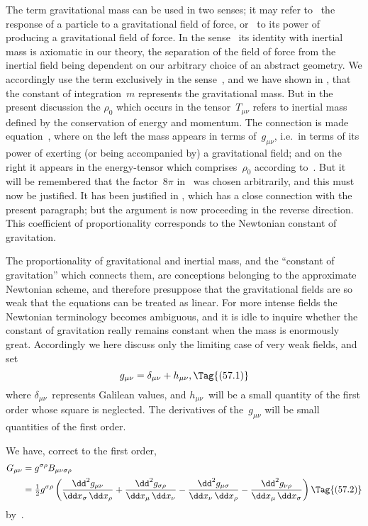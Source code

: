 \documentclass[12pt]{book}
\begin{document}
The term gravitational mass can be used in two senses; it may refer to
~the response of a particle to a gravitational field of force, or ~to its
power of producing a gravitational field of force. In the sense~ its identity
with inertial mass is axiomatic in our theory, the separation of the field of
force from the inertial field being dependent on our arbitrary choice of
an abstract geometry. We accordingly use the term exclusively in the sense~,
and we have shown in ,  that the constant of integration~$m$ represents
the gravitational mass. But in the present discussion the $\rho_{0}$ which
occurs in the tensor~$T_{\mu\nu}$ refers to inertial mass defined by the conservation of
energy and momentum. The connection is made  equation~, where
on the left the mass appears in terms of~$g_{\mu\nu}$, i.e.\ in terms of its power of
exerting (or being accompanied by) a gravitational field; and on the right it
appears in the energy\hyp{}tensor which comprises~$\rho_{0}$ according to~. But it
will be remembered that the factor~$8\pi$ in~ was chosen arbitrarily, and
this must now be justified\footnotemark.\footnotetext
  {It has been justified in , which has a close connection with the present paragraph; but
  the argument is now proceeding in the reverse direction.}
This coefficient of proportionality corresponds to
the Newtonian constant of gravitation.

The proportionality of gravitational and inertial mass, and the ``constant
of gravitation'' which connects them, are conceptions belonging to the approximate
Newtonian scheme, and therefore presuppose that the gravitational
fields are so weak that the equations can be treated as linear. For more
intense fields the Newtonian terminology becomes ambiguous, and it is idle
to inquire whether the constant of gravitation really remains constant when
the mass is enormously great. Accordingly we here discuss only the limiting
case of very weak fields, and set
\[
g_{\mu\nu} = \delta_{\mu\nu} + h_{\mu\nu},
\Tag{(57.1)}
\]
where $\delta_{\mu\nu}$~represents Galilean values, and $h_{\mu\nu}$~will be a small quantity of the
first order whose square is neglected. The derivatives of the~$g_{\mu\nu}$ will be small
quantities of the first order.

We have, correct to the first order,
\begin{align*}
  G_{\mu\nu}
  &= g^{\sigma\rho} B_{\mu\nu\sigma\rho} \\
  &= \tfrac{1}{2}g^{\sigma\rho} \left(
    \frac{\dd^{2} g_{\mu\nu}}{\dd x_{\sigma}\, \dd x_{\rho}}
  + \frac{\dd^{2} g_{\sigma\rho}}{\dd x_{\mu}\, \dd x_{\nu}}
  - \frac{\dd^{2} g_{\mu\sigma}}{\dd x_{\nu}\, \dd x_{\rho}}
  - \frac{\dd^{2} g_{\nu\rho}}{\dd x_{\mu}\, \dd x_{\sigma}}\right)
\Tag{(57.2)}
\end{align*}
by~.
\end{document}
